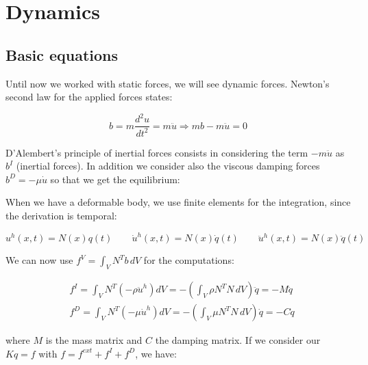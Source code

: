 
\chapter{Dynamics}
\section{Basic equations}
	
	Until now we worked with static forces, we will see dynamic forces. Newton's second law for the applied forces states: 
	
	\begin{equation}
	b = m \frac{d ^2u}{dt^2} = m\ddot{u} \Rightarrow mb-m\ddot{u} = 0
	\end{equation}
	
	D'Alembert's principle of inertial forces consists in considering the term $-m\ddot{u}$ as $b^I$ (inertial forces). In addition we consider also the viscous damping forces $b^D = -\mu \dot{u}$ so that we get the equilibrium:
	
	\begin{center}
	\end{center}
	
	When we have a deformable body, we use finite elements for the integration, since the derivation is temporal: 
	
	\begin{equation}
	u^h(x,t) = N(x) q(t) \qquad \dot{u}^h(x,t) = N(x) \dot{q}(t) \qquad \ddot{u}^h(x,t) = N(x) \ddot{q}(t)
	\end{equation}
	
	We can now use $f^V = \int _V N^T b\, dV$ for the computations: 
	
	\begin{equation}
	\begin{aligned}
	&f^I = \int _V N^T (-\rho \ddot{u}^h) dV = - \left(\int _V \rho N^T N\, dV \right) \ddot{q} = -M\ddot{q}\\
	&f^D = \int _V N^T (-\mu \dot{u}^h) dV = - \left(\int _V \mu N^T N\, dV \right) \dot{q} = -C\dot{q}
	\end{aligned}
	\end{equation}
	
	where $M$ is the mass matrix and $C$ the damping matrix. If we consider our $Kq = f$ with $f = f^{ext}+f^{I}+f^{D}$, we have: 
	
	\begin{center}
	\end{center}
	
